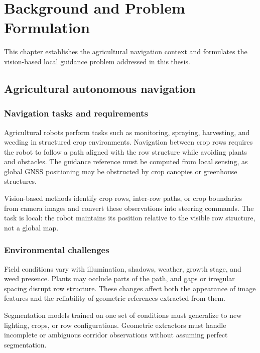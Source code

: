 \chapter{Background and Problem Formulation}
\label{cap:background}

This chapter establishes the agricultural navigation context and formulates the vision-based local guidance problem addressed in this thesis.

\section{Agricultural autonomous navigation}
\label{sec:agricultural_navigation}

\subsection{Navigation tasks and requirements}
\label{subsec:navigation_tasks}

Agricultural robots perform tasks such as monitoring, spraying, harvesting, and weeding in structured crop environments. Navigation between crop rows requires the robot to follow a path aligned with the row structure while avoiding plants and obstacles. The guidance reference must be computed from local sensing, as global GNSS positioning may be obstructed by crop canopies or greenhouse structures.

Vision-based methods identify crop rows, inter-row paths, or crop boundaries from camera images and convert these observations into steering commands. The task is local: the robot maintains its position relative to the visible row structure, not a global map.

\subsection{Environmental challenges}
\label{subsec:environmental_challenges}

Field conditions vary with illumination, shadows, weather, growth stage, and weed presence. Plants may occlude parts of the path, and gaps or irregular spacing disrupt row structure. These changes affect both the appearance of image features and the reliability of geometric references extracted from them.

Segmentation models trained on one set of conditions must generalize to new lighting, crops, or row configurations. Geometric extractors must handle incomplete or ambiguous corridor observations without assuming perfect segmentation.

